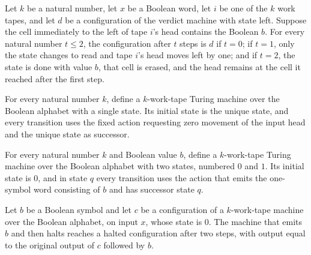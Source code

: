 \begin{theorem}
\label{Complexity.b2b_verdict_trace}
\leanok
{}
Let $k$ be a natural number, let $x$ be a Boolean word, let $i$ be one of the $k$ work
tapes, and let $d$ be a configuration of the verdict machine with state left. Suppose
the cell immediately to the left of tape $i$'s head contains the Boolean $b$. For every
natural number $t\le 2$, the configuration after $t$ steps is $d$ if $t=0$; if $t=1$,
only the state changes to read and tape $i$'s head moves left by one; and if $t=2$, the
state is done with value $b$, that cell is erased, and the head remains at the cell it
reached after the first step.
\end{theorem}

\begin{definition}
\label{Complexity.b2b_anchorTM}
\leanok
{}
For every natural number $k$, define a $k$-work-tape Turing machine over the Boolean
alphabet with a single state. Its initial state is the unique state, and every
transition uses the fixed action requesting zero movement of the input head and the
unique state as successor.
\end{definition}

\begin{definition}
\label{Complexity.b2b_answerTM}
\leanok
{}
For every natural number $k$ and Boolean value $b$, define a $k$-work-tape Turing
machine over the Boolean alphabet with two states, numbered $0$ and $1$. Its initial
state is $0$, and in state $q$ every transition uses the action that emits the
one-symbol word consisting of $b$ and has successor state $q$.
\end{definition}

\begin{theorem}
\label{Complexity.b2b_answer_run}
\leanok
{}
Let $b$ be a Boolean symbol and let $c$ be a configuration of a $k$-work-tape machine
over the Boolean alphabet, on input $x$, whose state is $0$. The machine that emits $b$
and then halts reaches a halted configuration after two steps, with output equal to the
original output of $c$ followed by $b$.
\end{theorem}

